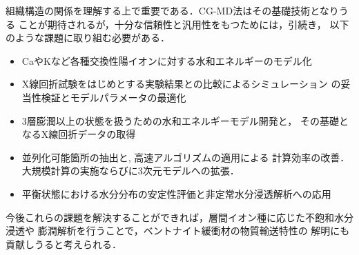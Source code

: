 ﻿\documentclass[11pt,a4j]{jarticle}
\begin{document}
組織構造の関係を理解する上で重要である．CG-MD法はその基礎技術となりうる
ことが期待されるが，十分な信頼性と汎用性をもつためには，引続き，
以下のような課題に取り組む必要がある．
\begin{itemize}
\item
	CaやKなど各種交換性陽イオンに対する水和エネルギーのモデル化
\item
	X線回折試験をはじめとする実験結果との比較によるシミュレーション
	の妥当性検証とモデルパラメータの最適化
\item
    	3層膨潤以上の状態を扱うための水和エネルギーモデル開発と，
	その基礎となるX線回折データの取得
\item
	並列化可能箇所の抽出と, 高速アルゴリズムの適用による
	計算効率の改善．大規模計算の実施ならびに3次元モデルへの拡張．
\item
	平衡状態における水分分布の安定性評価と非定常水分浸透解析への応用
\end{itemize}
今後これらの課題を解決することができれば，層間イオン種に応じた不飽和水分浸透や
膨潤解析を行うことで，ベントナイト緩衝材の物質輸送特性の
解明にも貢献しうると考えられる．
\end{document}
